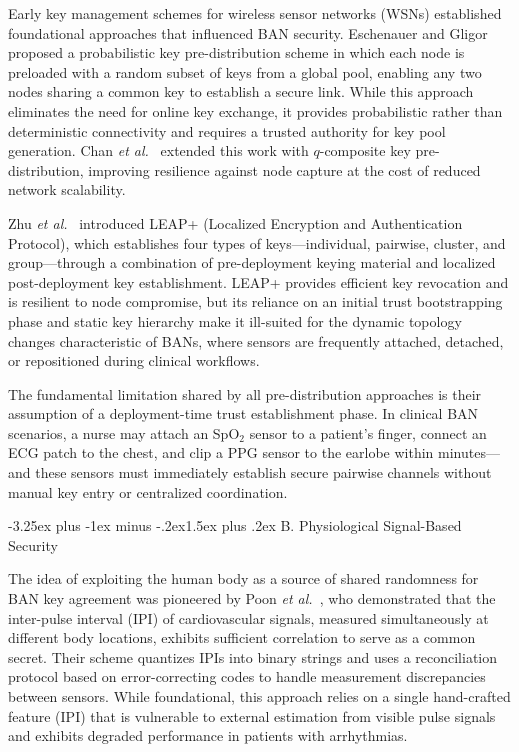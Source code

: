 \documentclass[10pt,twocolumn]{article}
\makeatletter
\renewcommand{\subsection}{\@startsection{subsection}{2}{\z@}%
  {-3.25ex plus -1ex minus -.2ex}{1.5ex plus .2ex}%
  {\normalfont\normalsize\bfseries\itshape}}
\newcommand{\etal}{\textit{et al.}}
\makeatother
\begin{document}
Early key management schemes for wireless sensor networks (WSNs) established foundational approaches that influenced BAN security. Eschenauer and Gligor~\cite{eschenauer2002random} proposed a probabilistic key pre-distribution scheme in which each node is preloaded with a random subset of keys from a global pool, enabling any two nodes sharing a common key to establish a secure link. While this approach eliminates the need for online key exchange, it provides probabilistic rather than deterministic connectivity and requires a trusted authority for key pool generation. Chan \etal~\cite{chan2003random} extended this work with $q$-composite key pre-distribution, improving resilience against node capture at the cost of reduced network scalability.

Zhu \etal~\cite{zhu2006leap} introduced LEAP+ (Localized Encryption and Authentication Protocol), which establishes four types of keys---individual, pairwise, cluster, and group---through a combination of pre-deployment keying material and localized post-deployment key establishment. LEAP+ provides efficient key revocation and is resilient to node compromise, but its reliance on an initial trust bootstrapping phase and static key hierarchy make it ill-suited for the dynamic topology changes characteristic of BANs, where sensors are frequently attached, detached, or repositioned during clinical workflows.

The fundamental limitation shared by all pre-distribution approaches is their assumption of a deployment-time trust establishment phase. In clinical BAN scenarios, a nurse may attach an SpO$_2$ sensor to a patient's finger, connect an ECG patch to the chest, and clip a PPG sensor to the earlobe within minutes---and these sensors must immediately establish secure pairwise channels without manual key entry or centralized coordination.

\subsection{B. Physiological Signal-Based Security}
\label{subsec:physio_security}

The idea of exploiting the human body as a source of shared randomness for BAN key agreement was pioneered by Poon \etal~\cite{poon2006novel}, who demonstrated that the inter-pulse interval (IPI) of cardiovascular signals, measured simultaneously at different body locations, exhibits sufficient correlation to serve as a common secret. Their scheme quantizes IPIs into binary strings and uses a reconciliation protocol based on error-correcting codes to handle measurement discrepancies between sensors. While foundational, this approach relies on a single hand-crafted feature (IPI) that is vulnerable to external estimation from visible pulse signals and exhibits degraded performance in patients with arrhythmias.
\end{document}
